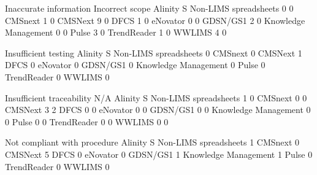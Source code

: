 \documentclass{article}
\begin{document}
\begin{Schunk}
\begin{Soutput}
                                  Inaccurate information Incorrect scope
  Alinity S Non-LIMS spreadsheets                      0               0
  CMSnext                                              1               0
  CMSNext                                              9               0
  DFCS                                                 1               0
  eNovator                                             0               0
  GDSN/GS1                                             2               0
  Knowledge Management                                 0               0
  Pulse                                                3               0
  TrendReader                                          1               0
  WWLIMS                                               4               0

                                  Insufficient testing
  Alinity S Non-LIMS spreadsheets                    0
  CMSnext                                            0
  CMSNext                                            1
  DFCS                                               0
  eNovator                                           0
  GDSN/GS1                                           0
  Knowledge Management                               0
  Pulse                                              0
  TrendReader                                        0
  WWLIMS                                             0

                                  Insufficient traceability N/A
  Alinity S Non-LIMS spreadsheets                         1   0
  CMSnext                                                 0   0
  CMSNext                                                 3   2
  DFCS                                                    0   0
  eNovator                                                0   0
  GDSN/GS1                                                0   0
  Knowledge Management                                    0   0
  Pulse                                                   0   0
  TrendReader                                             0   0
  WWLIMS                                                  0   0

                                  Not compliant with procedure
  Alinity S Non-LIMS spreadsheets                            1
  CMSnext                                                    0
  CMSNext                                                    5
  DFCS                                                       0
  eNovator                                                   0
  GDSN/GS1                                                   1
  Knowledge Management                                       1
  Pulse                                                      0
  TrendReader                                                0
  WWLIMS                                                     0


\end{Soutput}
\end{Schunk}
\end{document}
